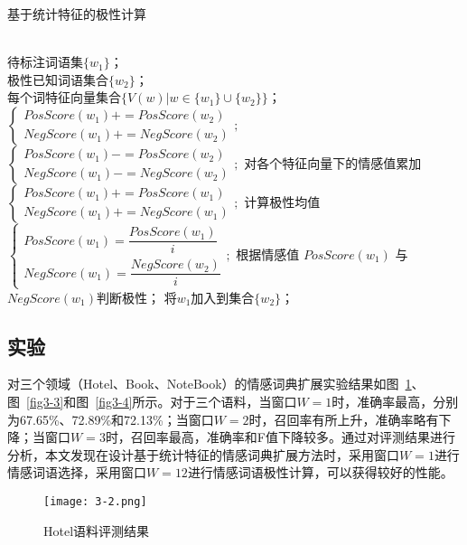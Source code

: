 \begin{algorithm}[htp]
\caption{基于统计特征的极性计算}
\label{alg3-2}
\begin{algorithmic}[1]
\REQUIRE ~~\\
待标注词语集$\{w_1\}$；\\
极性已知词语集合$\{w_2\}$；\\
每个词特征向量集合$\{V(w)|w \in \{w_1\}\cup \{w_2\} \}$；
\STATE $
\begin{cases}
PosScore(w_1)+=PosScore(w_2)\\
NegScore(w_1)+=NegScore(w_2)
\end{cases};$
\ELSE
\STATE $
\begin{cases}
PosScore(w_1)-=PosScore(w_2)\\
NegScore(w_1)-=NegScore(w_2)
\end{cases};$
\ENDIF
\ENDFOR
\STATE 对各个特征向量下的情感值累加
\STATE $
\begin{cases}
PosScore(w_1)+=PosScore(w_1)\\
NegScore(w_1)+=NegScore(w_1)
\end{cases};$
\ENDFOR
\STATE 计算极性均值$
\begin{cases}
PosScore(w_1)=\dfrac{PosScore(w_1)}{i}\\
NegScore(w_1)=\dfrac{NegScore(w_2)}{i}
\end{cases};$
\STATE 根据情感值 $PosScore(w_1)$ 与$ NegScore(w_1) $判断极性；
\STATE 将$ w_1 $加入到集合$ \{w_2\} $；
\ENDFOR
\end{algorithmic}
\end{algorithm}

\subsection{实验}
对三个领域（Hotel、Book、NoteBook）的情感词典扩展实验结果如图~\ref{fig3-2}、图~\ref{fig3-3}和图~\ref{fig3-4}所示。对于三个语料，当窗口$W=1$时，准确率最高，分别为67.65\%、72.89\%和72.13\%；当窗口$W=2$时，召回率有所上升，准确率略有下降；当窗口$W=3$时，召回率最高，准确率和F值下降较多。通过对评测结果进行分析，本文发现在设计基于统计特征的情感词典扩展方法时，采用窗口$W=1$进行情感词语选择，采用窗口$W=12$进行情感词语极性计算，可以获得较好的性能。

\begin{figure}[htp]
\centering
\texttt{[image: 3-2.png]}
\caption{Hotel语料评测结果}
\label{fig3-2}
\end{figure}

